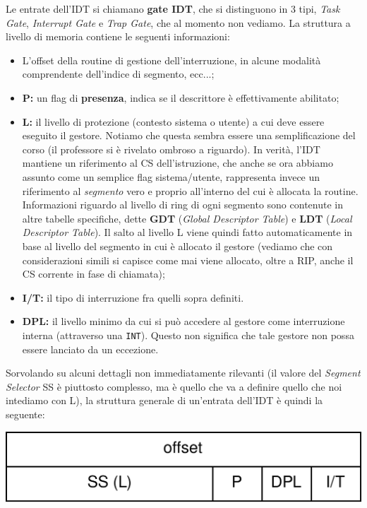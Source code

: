 \documentclass[a4paper,11pt]{article}
\begin{document}
Le entrate dell'IDT si chiamano \textbf{gate IDT}, che si distinguono in 3 tipi, \textit{Task Gate}, \textit{Interrupt Gate} e \textit{Trap Gate}, che al momento non vediamo.
La struttura a livello di memoria contiene le seguenti informazioni:
\begin{itemize}
	\item L'offset della routine di gestione dell'interruzione, in alcune modalità comprendente dell'indice di segmento, ecc...;
	\item \textbf{P:} un flag di \textbf{presenza}, indica se il descrittore è effettivamente abilitato;
	\item \textbf{L:} il livello di protezione (contesto sistema o utente) a cui deve essere eseguito il gestore. Notiamo che questa sembra essere una semplificazione del corso (il professore si è rivelato ombroso a riguardo). In verità, l'IDT mantiene un riferimento al CS dell'istruzione, che anche se ora abbiamo assunto come un semplice flag sistema/utente, rappresenta invece un riferimento al \textit{segmento} vero e proprio all'interno del cui è allocata la routine. Informazioni riguardo al livello di ring di ogni segmento sono contenute in altre tabelle specifiche, dette \textbf{GDT} (\textit{Global Descriptor Table}) e \textbf{LDT} (\textit{Local Descriptor Table}). Il salto al livello L viene quindi fatto automaticamente in base al livello del segmento in cui è allocato il gestore (vediamo che con considerazioni simili si capisce come mai viene allocato, oltre a RIP, anche il CS corrente in fase di chiamata);
	\item \textbf{I/T:} il tipo di interruzione fra quelli sopra definiti.
	\item \textbf{DPL:} il livello minimo da cui si può accedere al gestore come interruzione interna (attraverso una \lstinline|INT|).
		Questo non significa che tale gestore non possa essere lanciato da un eccezione. 
\end{itemize}		

Sorvolando su alcuni dettagli non immediatamente rilevanti (il valore del \textit{Segment Selector} SS è piuttosto complesso, ma è quello che va a definire quello che noi intediamo con L), la struttura generale di un'entrata dell'IDT è quindi la seguente:
\begin{center}
	\includegraphics[scale=0.2]{../figures/entrata_idt.png}
\end{center}
\end{document}

